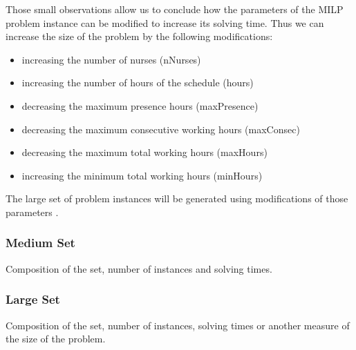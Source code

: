 Those small observations allow us to conclude how the parameters of the MILP problem instance can be modified to increase its solving time. Thus we can increase the size of the problem by the following modifications:\\
\begin{itemize}
	\item increasing the number of nurses (nNurses)
	\item increasing the number of hours of the schedule (hours)
	\item decreasing the maximum presence hours (maxPresence)
	\item decreasing the maximum consecutive working hours (maxConsec)
	\item decreasing the maximum total working hours (maxHours)
	\item increasing the minimum total working hours (minHours)
\end{itemize}
The large set of problem instances will be generated using modifications of those parameters .


\subsubsection{Medium Set}

Composition of the set, number of instances and solving times.

\subsubsection{Large Set}

Composition of the set, number of instances, solving times or another measure of the size of the problem.


\pagebreak